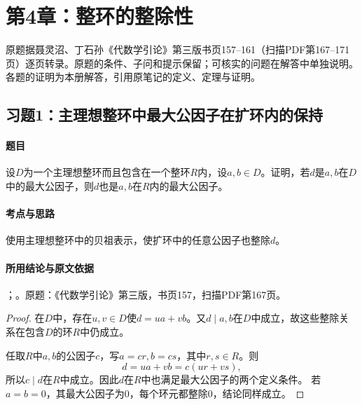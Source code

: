 
\clearpage\section{第4章：整环的整除性}

原题据聂灵沼、丁石孙《代数学引论》第三版书页157--161（扫描PDF第167--171页）逐页转录。原题的条件、子问和提示保留；可核实的问题在解答中单独说明。各题的证明为本册解答，引用原笔记的定义、定理与证明。

\subsection{习题1：主理想整环中最大公因子在扩环内的保持}

\label{ex:4:1}

\paragraph{题目}

设$D$为一个主理想整环而且包含在一个整环$R$内，设$a,b\in D$。证明，若$d$是$a,b$在$D$中的最大公因子，则$d$也是$a,b$在$R$内的最大公因子。

\paragraph{考点与思路}

使用主理想整环中的贝祖表示，使扩环中的任意公因子也整除$d$。

\paragraph{所用结论与原文依据}

；。原题：《代数学引论》第三版，书页157，扫描PDF第167页。


\begin{proof}

在$D$中，存在$u,v\in D$使$d=ua+vb$。又$d\mid a,b$在$D$中成立，故这些整除关系在包含$D$的环$R$中仍成立。

任取$R$中$a,b$的公因子$c$，写$a=cr,b=cs$，其中$r,s\in R$。则
\[
d=ua+vb=c(ur+vs),
\]
所以$c\mid d$在$R$中成立。因此$d$在$R$中也满足最大公因子的两个定义条件。
若$a=b=0$，其最大公因子为$0$，每个环元都整除$0$，结论同样成立。

\end{proof}

